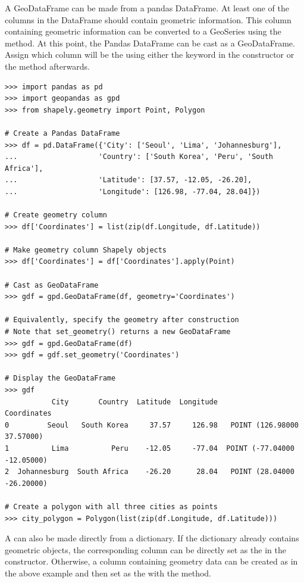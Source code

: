 A GeoDataFrame can be made from a pandas DataFrame.
At least one of the columns in the DataFrame should contain geometric information.
This column containing geometric information can be converted to a GeoSeries using the  method.
At this point, the Pandas DataFrame can be cast as a GeoDataFrame.
Assign which column will be the  using either the  keyword in the constructor or the  method afterwards.

\begin{lstlisting}
>>> import pandas as pd
>>> import geopandas as gpd
>>> from shapely.geometry import Point, Polygon

# Create a Pandas DataFrame
>>> df = pd.DataFrame({'City': ['Seoul', 'Lima', 'Johannesburg'],
...                   'Country': ['South Korea', 'Peru', 'South Africa'],
...                   'Latitude': [37.57, -12.05, -26.20],
...                   'Longitude': [126.98, -77.04, 28.04]})

# Create geometry column
>>> df['Coordinates'] = list(zip(df.Longitude, df.Latitude))

# Make geometry column Shapely objects
>>> df['Coordinates'] = df['Coordinates'].apply(Point)

# Cast as GeoDataFrame
>>> gdf = gpd.GeoDataFrame(df, geometry='Coordinates')

# Equivalently, specify the geometry after construction
# Note that set_geometry() returns a new GeoDataFrame
>>> gdf = gpd.GeoDataFrame(df)
>>> gdf = gdf.set_geometry('Coordinates')

# Display the GeoDataFrame
>>> gdf
           City       Country  Latitude  Longitude                  Coordinates
0         Seoul   South Korea     37.57     126.98   POINT (126.98000 37.57000)
1          Lima          Peru    -12.05     -77.04  POINT (-77.04000 -12.05000)
2  Johannesburg  South Africa    -26.20      28.04   POINT (28.04000 -26.20000)

# Create a polygon with all three cities as points
>>> city_polygon = Polygon(list(zip(df.Longitude, df.Latitude)))
\end{lstlisting}

A  can also be made directly from a dictionary.
If the dictionary already contains geometric objects, the corresponding column can be directly set as the  in the constructor.
Otherwise, a column containing geometry data can be created as in the above example and then set as the  with the  method.

